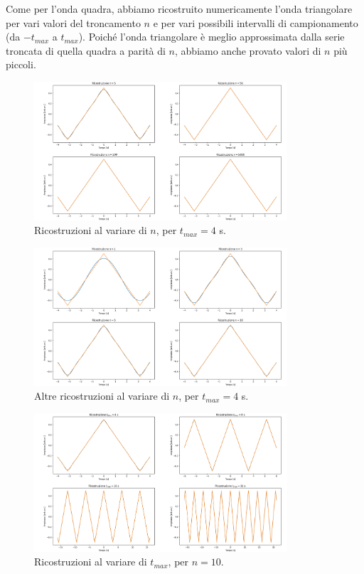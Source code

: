 \documentclass{article}[a4paper, oneside,11pt]
\begin{document}
    \noindent Come per l'onda quadra, abbiamo ricostruito numericamente l'onda triangolare per vari valori del troncamento $n$ e per vari possibili intervalli di campionamento (da $-t_{max}$ a $t_{max}$). Poiché l'onda triangolare è meglio approssimata dalla serie troncata di quella quadra a parità di $n$, abbiamo anche provato valori di $n$ più piccoli.
        \begin{figure}[H]
            \centering
            \includegraphics[width=0.84\textwidth]{img/Ricostruzione_onda_triangolare_troncamento.png}
            \caption{Ricostruzioni al variare di $n$, per $t_{max}=4$ s.}
            \label{Fig_OTT}
        \end{figure}\begin{figure}[H]
            \centering
            \includegraphics[width=0.84\textwidth]{img/Ricostruzione_onda_triangolare_troncamento_basso.png}
            \caption{Altre ricostruzioni al variare di $n$, per $t_{max}=4$ s.}
            \label{Fig_OTTB}
        \end{figure}
        \begin{figure}[H]
            \centering
            \includegraphics[width=0.84\textwidth]{img/Ricostruzione_onda_triangolare_campionamento.png}
            \caption{Ricostruzioni al variare di $t_{max}$, per $n=10$.}
            \label{Fig_OTC}
        \end{figure}
\end{document}

